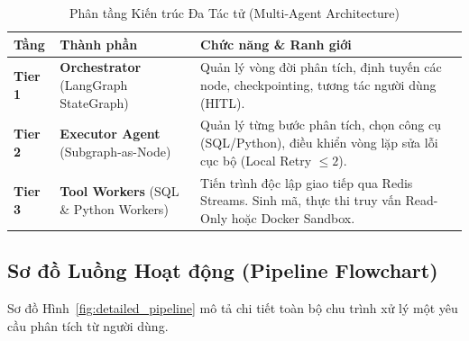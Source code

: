 \documentclass[12pt, a4paper]{article}
\begin{document}
\begin{table}[H]
\centering
\caption{Phân tầng Kiến trúc Đa Tác tử (Multi-Agent Architecture)}
\label{tab:agent_architecture}
\begin{tabularx}{\textwidth}{lp{4.2cm}X}
\toprule
\textbf{Tầng} & \textbf{Thành phần} & \textbf{Chức năng \& Ranh giới} \\
\midrule
\textbf{Tier 1} & \textbf{Orchestrator} (LangGraph StateGraph) & Quản lý vòng đời phân tích, định tuyến các node, checkpointing, tương tác người dùng (HITL). \\
\addlinespace
\textbf{Tier 2} & \textbf{Executor Agent} (Subgraph-as-Node) & Quản lý từng bước phân tích, chọn công cụ (SQL/Python), điều khiển vòng lặp sửa lỗi cục bộ (Local Retry $\le 2$). \\
\addlinespace
\textbf{Tier 3} & \textbf{Tool Workers} (SQL \& Python Workers) & Tiến trình độc lập giao tiếp qua Redis Streams. Sinh mã, thực thi truy vấn Read-Only hoặc Docker Sandbox. \\
\bottomrule
\end{tabularx}
\end{table}

\subsection{Sơ đồ Luồng Hoạt động (Pipeline Flowchart)}
Sơ đồ Hình~\ref{fig:detailed_pipeline} mô tả chi tiết toàn bộ chu trình xử lý một yêu cầu phân tích từ người dùng.
\end{document}
